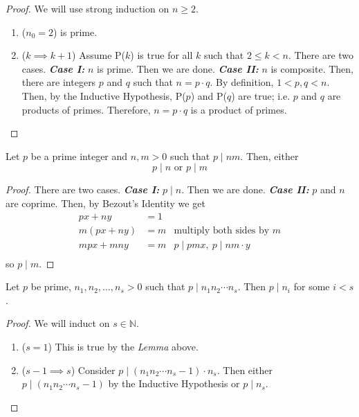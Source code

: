 \documentclass{report}
\newcommand{\N}{\mathbb{N}}
\newcommand{\textib}[1]{\textit{\textbf{{#1}}}}
\newcommand{\corollary}[1]{\begin{tcolorbox}[title=\textit{Corollary}]{#1}\end{tcolorbox}}
\newcommand{\lemma}[1]{\begin{tcolorbox}[title=\textit{Lemma}]{#1}\end{tcolorbox}}
\begin{document}
\begin{proof}
    We will use strong induction on $n \geq 2$.
    \begin{enumerate}[label=\textit{(\roman*)}]
        \item ($n_0 = 2$)
             is prime.
        \item ($k \implies k + 1$)
            \newline
            Assume P($k$) is true for all $k$ such that $2 \leq k < n$. There are two cases.
            \newline
            \newline
            \textib{Case I:} $n$ is prime. Then we are done.
            \newline
            \textib{Case II:} $n$ is composite. Then, there are integers $p$ and $q$ such that
            $n = p \cdot q$. By definition, $1 < p, q < n$. Then, by the Inductive Hypothesis, 
            P($p$) and P($q$) are true; i.e. $p$ and $q$ are products of primes. Therefore, 
            $n = p \cdot q$ is a product of primes.
    \end{enumerate}
\end{proof}
\lemma {
    Let $p$ be a prime integer and $n, m > 0$ such that $p \mid nm$. Then, either
    \[p \mid n \text{ or } p \mid m\]
}
\begin{proof}
    There are two cases.
    \newline
    \newline
    \textib{Case I:} $p \mid n$. Then we are done.
    \newline
    \textib{Case II:} $p$ and $n$ are coprime. Then, by Bezout's Identity we get
    \begin{align*}
        px + ny &= 1 \\
        m(px + ny) &= m & \text{multiply both sides by } m \\
        mpx + mny &= m & p \mid pmx, \ p \mid nm \cdot y \\
    \end{align*}
    so $p \mid m$.
\end{proof}

\corollary {
    Let $p$ be prime, $n_1, n_2, \ldots, n_s > 0$ such that $p \mid n_1 n_2 \cdots n_s$. Then
    $p \mid n_i$ for some $i < s$.
}
\begin{proof}
    We will induct on $s \in \N$.
    \begin{enumerate}[label=\textit{(\roman*)}]
        \item ($s = 1$)
            \newline
            This is true by the \textit{Lemma} above.
        \item ($s - 1 \implies s$)
            \newline
            Consider $p \mid (n_1 n_2 \cdots n_s - 1) \cdot n_s$. Then either 
            $p \mid (n_1 n_2 \cdots n_s - 1)$ by the Inductive Hypothesis or $p \mid n_s$.
    \end{enumerate}
\end{proof}
\end{document}
